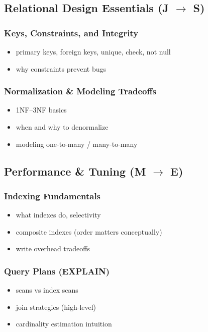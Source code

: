 \subsection{Relational Design Essentials (J $\rightarrow$ S)}

\subsubsection{Keys, Constraints, and Integrity}
\begin{itemize}
    \item primary keys, foreign keys, unique, check, not null
    \item why constraints prevent bugs
\end{itemize}

\subsubsection{Normalization \& Modeling Tradeoffs}
\begin{itemize}
    \item 1NF--3NF basics
    \item when and why to denormalize
    \item modeling one-to-many / many-to-many
\end{itemize}

\subsection{Performance \& Tuning (M $\rightarrow$ E)}

\subsubsection{Indexing Fundamentals}
\begin{itemize}
    \item what indexes do, selectivity
    \item composite indexes (order matters conceptually)
    \item write overhead tradeoffs
\end{itemize}

\subsubsection{Query Plans (EXPLAIN)}
\begin{itemize}
    \item scans vs index scans
    \item join strategies (high-level)
    \item cardinality estimation intuition
\end{itemize}

